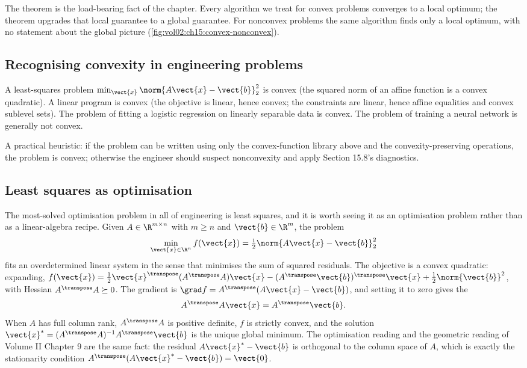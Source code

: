 The theorem is the load-bearing fact of the chapter. Every
algorithm we treat for convex problems converges to a local
optimum; the theorem upgrades that local guarantee to a global
guarantee. For nonconvex problems the same algorithm finds only
a local optimum, with no statement about the global picture
(\cref{fig:vol02:ch15:convex-nonconvex}).



\subsection{Recognising convexity in engineering problems}

A least-squares problem $\min_{\vect{x}} \norm{A \vect{x} -
\vect{b}}_{2}^{2}$ is convex (the squared norm of an affine
function is a convex quadratic). A linear program is convex (the
objective is linear, hence convex; the constraints are linear,
hence affine equalities and convex sublevel sets). The problem of
fitting a logistic regression on linearly separable data is
convex. The problem of training a neural network is generally
not convex.

A practical heuristic: if the problem can be written using only
the convex-function library above and the convexity-preserving
operations, the problem is convex; otherwise the engineer
should suspect nonconvexity and apply Section 15.8's diagnostics.

\subsection{Least squares as optimisation}

The most-solved optimisation problem in all of engineering is
least squares, and it is worth seeing it as an optimisation
problem rather than as a linear-algebra recipe. Given $A \in
\R^{m \times n}$ with $m \geq n$ and $\vect{b} \in \R^{m}$, the
problem
\[
\min_{\vect{x} \in \R^{n}} f(\vect{x}) = \tfrac{1}{2}
\norm{A \vect{x} - \vect{b}}_{2}^{2}
\]
fits an overdetermined linear system in the sense that minimises
the sum of squared residuals. The objective is a convex quadratic:
expanding, $f(\vect{x}) = \tfrac{1}{2} \vect{x}^{\transpose}
(A^{\transpose} A) \vect{x} - (A^{\transpose} \vect{b})^{\transpose}
\vect{x} + \tfrac{1}{2} \norm{\vect{b}}^{2}$, with Hessian
$A^{\transpose} A \succeq 0$. The gradient is $\grad f =
A^{\transpose}(A \vect{x} - \vect{b})$, and setting it to zero
gives the 
\[
A^{\transpose} A \vect{x} = A^{\transpose} \vect{b}.
\]
When $A$ has full column rank, $A^{\transpose} A$ is positive
definite, $f$ is strictly convex, and the solution $\vect{x}^{*}
= (A^{\transpose} A)^{-1} A^{\transpose} \vect{b}$ is the unique
global minimum. The optimisation reading and the geometric reading
of Volume II Chapter 9 are the same fact: the residual $A
\vect{x}^{*} - \vect{b}$ is orthogonal to the column space of $A$,
which is exactly the stationarity condition $A^{\transpose}(A
\vect{x}^{*} - \vect{b}) = \vect{0}$.

